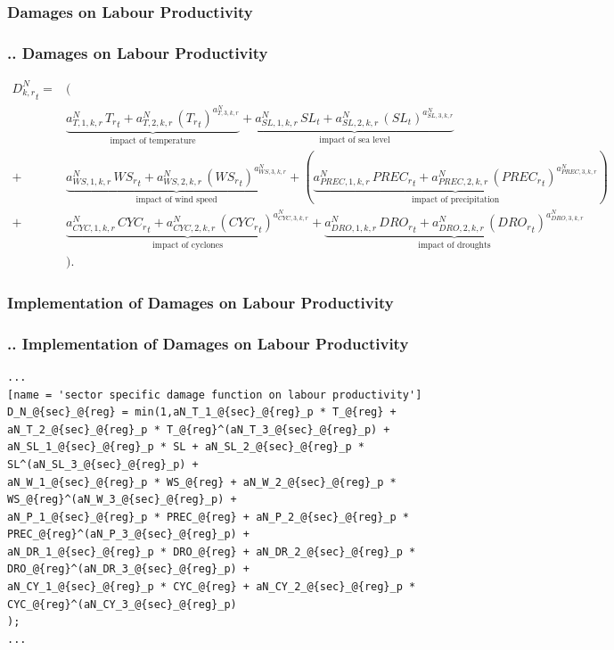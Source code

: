 \documentclass[11pt,aspectratio=169]{beamer}
\begin{document}
\subsubsection{Damages on Labour Productivity}
\begin{frame}
\frametitle{{\thesection.\thesubsection.\thesubsubsection} Damages on Labour Productivity}
\scriptsize
\begin{align*}
{{D^{N}_{k,r}}_{t}}=& \Big( \nonumber \\
&\underbrace{{{a^{N}_{T,1,k,r}}} \, {{T_{r}}_{t}}+{{a^{N}_{T,2,k,r}}}\, \left({T_{r}}_{t}\right)^{a^{N}_{T,3,k,r}}}_{\mbox{impact of temperature}} + 
\underbrace{{{a^{N}_{SL,1,k,r}}}\, {{SL}_{t}}+{{a^{N}_{SL,2,k,r}}}\, \left({SL}_{t}\right)^{{{a^{N}_{SL,3,k,r}}}}}_{\mbox{impact of sea level}} \nonumber \\
+ & \underbrace{{{a^{N}_{WS,1,k,r}}}\, {{WS_{r}}_{t}}+{{a^{N}_{WS,2,k,r}}}\, \left({WS_{r}}_{t}\right)^{{{a^{N}_{WS,3,k,r}}}}}_{\mbox{impact of wind speed}} 
+ (\underbrace{{{a^{N}_{PREC,1,k,r}}} \, {{PREC_{r}}_{t}}+{{a^{N}_{PREC,2,k,r}}}\, \left({PREC_{r}}_{t}\right)^{{{a^{N}_{PREC,3,k,r}}}}}_{\mbox{impact of precipitation}}) \,  \nonumber \\
+ & \underbrace{{{a^{N}_{CYC,1,k,r}}}\, {{CYC_{r}}_{t}}+{{a^{N}_{CYC,2,k,r}}}\, \left({CYC_{r}}_{t}\right)^{{{a^{N}_{CYC,3,k,r}}}}}_{\mbox{impact of cyclones}}
+ \underbrace{{{a^{N}_{DRO,1,k,r}}} \, {{DRO_{r}}_{t}}+{{a^{N}_{DRO,2,k,r}}}\, \left({DRO_{r}}_{t}\right)^{{{a^{N}_{DRO,3,k,r}}}}}_{\mbox{impact of droughts}} \nonumber \\
&\Big).
\end{align*}
\end{frame}

\subsubsection{Implementation of Damages on Labour Productivity}
\begin{frame}[fragile]
\frametitle{{\thesection.\thesubsection.\thesubsubsection} Implementation of Damages on Labour Productivity}

\begin{lstlisting}[frame = single]
...
[name = 'sector specific damage function on labour productivity']
D_N_@{sec}_@{reg} = min(1,aN_T_1_@{sec}_@{reg}_p * T_@{reg} + aN_T_2_@{sec}_@{reg}_p * T_@{reg}^(aN_T_3_@{sec}_@{reg}_p) + 
aN_SL_1_@{sec}_@{reg}_p * SL + aN_SL_2_@{sec}_@{reg}_p * SL^(aN_SL_3_@{sec}_@{reg}_p) +
aN_W_1_@{sec}_@{reg}_p * WS_@{reg} + aN_W_2_@{sec}_@{reg}_p * WS_@{reg}^(aN_W_3_@{sec}_@{reg}_p) + 
aN_P_1_@{sec}_@{reg}_p * PREC_@{reg} + aN_P_2_@{sec}_@{reg}_p * PREC_@{reg}^(aN_P_3_@{sec}_@{reg}_p) + 
aN_DR_1_@{sec}_@{reg}_p * DRO_@{reg} + aN_DR_2_@{sec}_@{reg}_p * DRO_@{reg}^(aN_DR_3_@{sec}_@{reg}_p) +
aN_CY_1_@{sec}_@{reg}_p * CYC_@{reg} + aN_CY_2_@{sec}_@{reg}_p * CYC_@{reg}^(aN_CY_3_@{sec}_@{reg}_p)
);
...
\end{lstlisting}
\end{frame}
\end{document}

